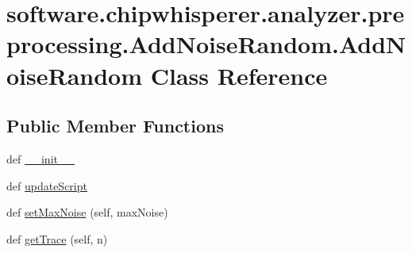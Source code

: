 \hypertarget{classsoftware_1_1chipwhisperer_1_1analyzer_1_1preprocessing_1_1AddNoiseRandom_1_1AddNoiseRandom}{}\section{software.\+chipwhisperer.\+analyzer.\+preprocessing.\+Add\+Noise\+Random.\+Add\+Noise\+Random Class Reference}
\label{classsoftware_1_1chipwhisperer_1_1analyzer_1_1preprocessing_1_1AddNoiseRandom_1_1AddNoiseRandom}
\subsection*{Public Member Functions}
\begin{DoxyCompactItemize}
\item 
def \hyperlink{classsoftware_1_1chipwhisperer_1_1analyzer_1_1preprocessing_1_1AddNoiseRandom_1_1AddNoiseRandom_a8798816503028d22aa46f4527297e7cf}{\+\_\+\+\_\+init\+\_\+\+\_\+}
\item 
def \hyperlink{classsoftware_1_1chipwhisperer_1_1analyzer_1_1preprocessing_1_1AddNoiseRandom_1_1AddNoiseRandom_a8c47cd278cbb1b4a32130cb97ad48d4b}{update\+Script}
\item 
def \hyperlink{classsoftware_1_1chipwhisperer_1_1analyzer_1_1preprocessing_1_1AddNoiseRandom_1_1AddNoiseRandom_a852041bb6ade687e9c93349ca9c76f78}{set\+Max\+Noise} (self, max\+Noise)
\item 
def \hyperlink{classsoftware_1_1chipwhisperer_1_1analyzer_1_1preprocessing_1_1AddNoiseRandom_1_1AddNoiseRandom_a1690acfc7355fad470a37511aad0ad09}{get\+Trace} (self, n)
\end{DoxyCompactItemize}


